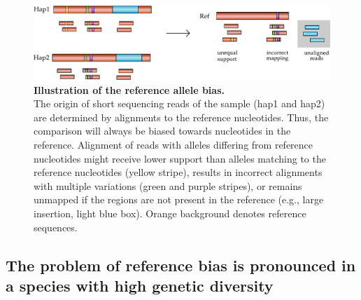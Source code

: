 \documentclass[../main.tex]{subfiles}
\begin{document}
\bigskip

\begin{figure}[!htb]
    \centering
    \includegraphics[width=\textwidth]{intro/fig2.pdf}
        \vspace{3mm}
        \caption[Illustration of the reference allele bias]{\textbf{Illustration of the reference allele bias.} \\
        \footnotesize{The origin of short sequencing reads of the sample (hap1 and hap2) are determined by alignments to the reference nucleotides. Thus, the comparison will always be biased towards nucleotides in the reference. Alignment of reads with alleles differing from reference nucleotides might receive lower support than alleles matching to the reference nucleotides (yellow stripe), results in incorrect alignments with multiple variations (green and purple stripes), or remains unmapped if the regions are not present in the reference (e.g., large insertion, light blue box). Orange background denotes reference sequences.}}
        \label{fig12:bias}
\end{figure}

\subsection*{The problem of reference bias is pronounced in a species with high genetic diversity}
\end{document}
